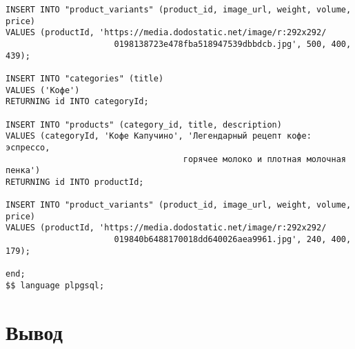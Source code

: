 \documentclass[a4paper,14pt]{extarticle}
\begin{document}
\begin{Verbatim}[tabsize=4,fontsize=\small]
INSERT INTO "product_variants" (product_id, image_url, weight, volume, price)
VALUES (productId, 'https://media.dodostatic.net/image/r:292x292/
                      0198138723e478fba518947539dbbdcb.jpg', 500, 400, 439);

INSERT INTO "categories" (title)
VALUES ('Кофе')
RETURNING id INTO categoryId;

INSERT INTO "products" (category_id, title, description)
VALUES (categoryId, 'Кофе Капучино', 'Легендарный рецепт кофе: эспрессо, 
                                    горячее молоко и плотная молочная пенка')
RETURNING id INTO productId;

INSERT INTO "product_variants" (product_id, image_url, weight, volume, price)
VALUES (productId, 'https://media.dodostatic.net/image/r:292x292/
                      019840b6488170018dd640026aea9961.jpg', 240, 400, 179);

end;
$$ language plpgsql;
  \end{Verbatim}

  \section*{Вывод}
\end{document}

